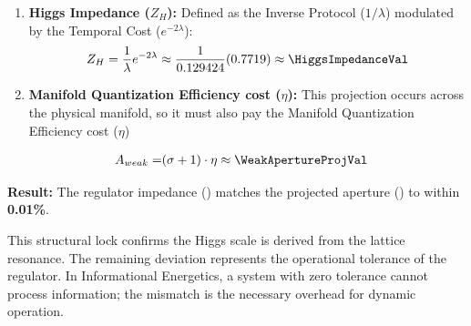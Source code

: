 \begin{enumerate}
    \item \textbf{Higgs Impedance ($Z_H$):} Defined as the Inverse Protocol ($1/\lambda$) modulated by the Temporal Cost ($e^{-2\lambda}$):
    \begin{equation}
    Z_H = \frac{1}{\lambda} e^{-2\lambda} \approx \frac{1}{0.129424} (0.7719) \approx \mathbf{\HiggsImpedanceVal}
    \end{equation}
    
    \item \textbf{Manifold  Quantization Efficiency cost ($\eta$):} This projection occurs across the physical manifold, so it must also pay the Manifold  Quantization Efficiency cost ($\eta$)
    
    \begin{equation}
    \begin{split}
    A_{weak} = & (\sigma + 1) \cdot \eta \approx \mathbf{\WeakApertureProjVal}
    \end{split}
    \end{equation}
\end{enumerate}

\textbf{Result:} The regulator impedance (\HiggsImpedanceVal) matches the projected aperture (\WeakApertureProjVal) to within \textbf{0.01\%}. 

This structural lock confirms the Higgs scale is derived from the lattice resonance. The remaining deviation represents the operational tolerance of the regulator. In Informational Energetics, a system with zero tolerance cannot process information; the mismatch is the necessary overhead for dynamic operation.